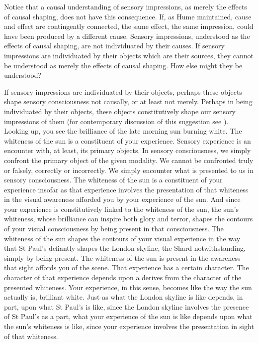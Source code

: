 Notice that a causal understanding of sensory impressions, as merely the effects of causal shaping, does not have this consequence. If, as Hume maintained, cause and effect are contingently connected, the same effect, the same impression, could have been produced by a different cause. Sensory impressions, understood as the effects of causal shaping, are not individuated by their causes. If sensory impressions are individuated by their objects which are their sources, they cannot be understood as merely the effects of causal shaping. How else might they be understood?

If sensory impressions are individuated by their objects, perhaps these objects shape sensory consciousness not causally, or at least not merely. Perhaps in being individuated by their objects, these objects constitutively shape our sensory impressions of them (for contemporary discussion of this suggestion see \citealt{McDowell:1998vn,Martin:2004fj,Fish:2009fk,Kalderon:2011fk}). Looking up, you see the brilliance of the late morning sun burning white. The whiteness of the sun is a constituent of your experience. Sensory experience is an encounter with, at least, its primary objects. In sensory consciousness, we simply confront the primary object of the given modality. We cannot be confronted truly or falsely, correctly or incorrectly. We simply encounter what is presented to us in sensory consciousness. The whiteness of the sun is a constituent of your experience insofar as that experience involves the presentation of that whiteness in the visual awareness afforded you by your experience of the sun. And since your experience is constitutively linked to the whiteness of the sun, the sun's whiteness, whose brilliance can inspire both glory and terror, shapes the contours of your visual consciousness by being present in that consciousness. The whiteness of the sun shapes the contours of your visual experience in the way that St Paul's defiantly shapes the London skyline, the Shard notwithstanding, simply by being present. The whiteness of the sun is present in the awareness that sight affords you of the scene. That experience has a certain character. The character of that experience depends upon a derives from the character of the presented whiteness. Your experience, in this sense, becomes like the way the sun actually is, brilliant white. Just as what the London skyline is like depends, in part, upon what St Paul's is like, since the London skyline involves the presence of St Paul's as a part, what your experience of the sun is like depends upon what the sun's whiteness is like, since your experience involves the presentation in sight of that whiteness.

